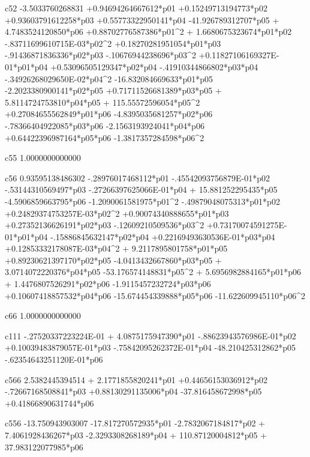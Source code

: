  c52
  -3.5033760268831 +0.94694264667612*p01 +0.15249713194773*p02 +0.93603791612258*p03 +0.55773322950141*p04  -41.926789312707*p05 + 4.7483524120850*p06 +0.88702776587386*p01^2 + 1.6680675323674*p01*p02  -.83711699610715E-03*p02^2 +0.18270281951054*p01*p03  -.91436871836336*p02*p03  -.10676944238696*p03^2 +0.11827106169327E-01*p01*p04 +0.53096505129347*p02*p04  -.41910344866802*p03*p04  -.34926268029650E-02*p04^2  -16.832084669633*p01*p05  -2.2023380900141*p02*p05 +0.71711526681389*p03*p05 + 5.8114724753810*p04*p05 + 115.55572596054*p05^2 +0.27084655562849*p01*p06  -4.8395035681257*p02*p06  -.78366404922085*p03*p06  -2.1563193924041*p04*p06 +0.64422396987164*p05*p06  -1.3817357284598*p06^2 
  
 c55
   1.0000000000000 
  
 c56
  0.93595138486302  -.28976017468112*p01  -.45542093756879E-01*p02  -.53144310569497*p03  -.27266397625066E-01*p04 + 15.881252295435*p05  -4.5906859663795*p06  -1.2090061581975*p01^2  -.49879048075313*p01*p02 +0.24829374753257E-03*p02^2 +0.90074340888655*p01*p03 +0.27352136626191*p02*p03  -.12609210509536*p03^2 +0.73170074591275E-01*p01*p04  -.15886845632147*p02*p04 +0.22169493630536E-01*p03*p04 +0.12853332178087E-03*p04^2 + 9.2117895801758*p01*p05 +0.89230621397170*p02*p05  -4.0413432667860*p03*p05 + 3.0714072220376*p04*p05  -53.176574148831*p05^2 + 5.6956982884165*p01*p06 + 1.4476807526291*p02*p06  -1.9115457232724*p03*p06 +0.10607418857532*p04*p06  -15.674454339888*p05*p06  -11.622609945110*p06^2 
  
 c66
   1.0000000000000 
  
 c111
  -.27520337223224E-01 + 4.0875175947390*p01  -.88623943576986E-01*p02 +0.10039483879057E-01*p03  -.75842095262372E-01*p04  -48.210425312862*p05  -.62354643251120E-01*p06 
  
 c566
   2.5382445394514 + 2.1771855820241*p01 +0.44656153036912*p02  -.72667168508841*p03 +0.88130291135006*p04  -37.816458672998*p05 +0.41866890631744*p06 
  
 c556
  -13.750943903007  -17.817270572935*p01  -2.7832067184817*p02 + 7.4061928436267*p03  -2.3293308268189*p04 + 110.87120004812*p05 + 37.983122077985*p06 
  
